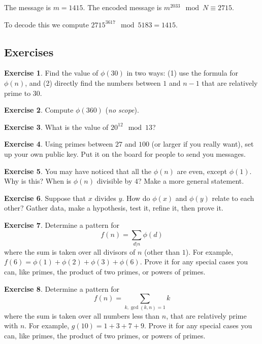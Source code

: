 \documentclass[11pt]{article}
\theoremstyle{definition}
\newtheorem{exercise}{Exercise}
\numberwithin{thm}{section}
\begin{document}
The message is $m = 1415$. The encoded message is $m^{2033} \mod N \equiv 2715$.

To decode this we compute $2715^{3617} \mod 5183 = 1415$.

\subsection{Exercises}

\begin{exercise} Find the value of $\phi(30)$ in two ways: (1) use the formula for $\phi(n)$, and (2) directly find the numbers between $1$ and $n-1$ that are relatively prime to $30$.
\end{exercise}

\begin{exercise} Compute $\phi(360)$ (\textit{no scope}).
\end{exercise}

\begin{exercise} What is the value of $ 20^{12} \mod 13$?
\end{exercise}

\begin{exercise} Using primes between $27$ and $100$ (or larger if you really want), set up your own public key. Put it on the board for people to send you messages. 
\end{exercise}

\begin{exercise} You may have noticed that all the $\phi(n)$ are even, except $\phi(1)$. Why is this? When is $\phi(n)$ divisible by $4$? Make a more general statement.
\end{exercise}

\begin{exercise} Suppose that $x$ divides $y$.  How do $\phi(x)$ and $\phi(y)$ relate to each other? Gather data, make a hypothesis, test it, refine it, then prove it.
\end{exercise}

\begin{exercise} Determine a pattern for
\[
	f(n) = \sum_{d | n} \phi(d)
\]
where the sum is taken over all divisors of $n$ (other than $1$). For example, $f(6) = \phi(1) + \phi(2) + \phi(3) + \phi(6)$. Prove it for any special cases you can, like primes, the product of two primes, or powers of primes.
\end{exercise}

\begin{exercise} Determine a pattern for
\[
	f(n) = \sum_{k, \gcd(k,n) = 1} k
\]
where the sum is taken over all numbers less than $n$, that are relatively prime with $n$. For example, $g(10) = 1 + 3 + 7 + 9$. Prove it for any special cases you can, like primes, the product of two primes, or powers of primes.
\end{exercise}
\end{document}
